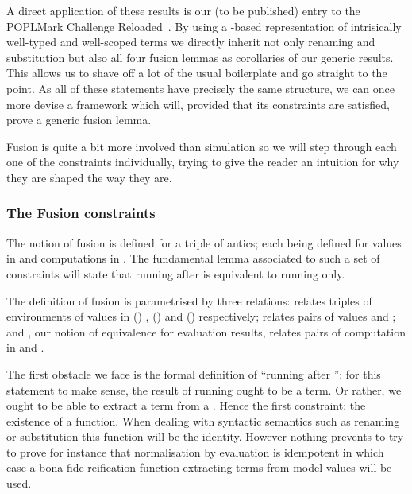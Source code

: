 A direct application of these results is our (to be published) entry to the
POPLMark Challenge Reloaded~\citeyear{poplmarkreloaded}. By using a -based
representation of intrisically well-typed and well-scoped terms we directly inherit
not only renaming and substitution but also all four fusion lemmas as corollaries
of our generic results. This allows us to shave off a lot of the usual boilerplate
and go straight to the point.
As all of these statements have precisely the same structure, we can
once more devise a framework which will, provided that its constraints are
satisfied, prove a generic fusion lemma.

Fusion is quite a bit more involved than simulation so we will step through
each one of the constraints individually, trying to give the reader an intuition
for why they are shaped the way they are.

\subsubsection{The Fusion constraints}

The notion of fusion is defined for a triple of antics; each 
being defined for values in  and computations in . The
fundamental lemma associated to such a set of constraints will state that
running  after  is equivalent to running  only.

The definition of fusion is parametrised by three relations:  relates
triples of environments of values in {(\Gamma {})  \Delta},
{(\Delta {})  \Theta} and {(\Gamma {})  \Theta}
respectively;  relates pairs of values and ;
and , our notion of equivalence for evaluation results, relates pairs
of computation in  and .


The first obstacle we face is the formal definition of ``running 
after '': for this statement to make sense, the result of running
 ought to be a term. Or rather, we ought to be able to extract a
term from a . Hence the first constraint: the existence of a 
function. When dealing with syntactic semantics such as renaming or substitution
this function will be the identity. However nothing prevents to try to prove for
instance that normalisation by evaluation is idempotent in which case a bona fide
reification function extracting terms from model values will be used.

